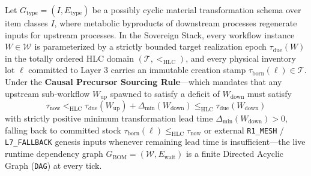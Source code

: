 \begin{theorem}
\label{thm:temporal-bom-dag}
Let $G_{\mathrm{type}} = (I, E_{\mathrm{type}})$ be a possibly cyclic material transformation schema over
item classes $I$, where metabolic byproducts of downstream processes regenerate inputs for upstream
processes. In the Sovereign Stack, every workflow instance $W \in \mathcal{W}$ is parameterized by a
strictly bounded target realization epoch $\tau_{\mathrm{due}}(W)$ in the totally ordered HLC domain
$(\mathcal{T}, <_{\mathrm{HLC}})$, and every physical inventory lot $\ell$ committed to Layer 3 carries an
immutable creation stamp $\tau_{\mathrm{born}}(\ell) \in \mathcal{T}$. Under the \textbf{Causal Precursor
Sourcing Rule}---which mandates that any upstream sub-workflow $W_{\mathrm{up}}$ spawned to satisfy a
deficit of $W_{\mathrm{down}}$ must satisfy
\begin{equation}
\label{eq:causal-precursor-rule}
\tau_{\mathrm{now}} <_{\mathrm{HLC}} \tau_{\mathrm{due}}(W_{\mathrm{up}}) + \Delta_{\min}(W_{\mathrm{down}}) \le_{\mathrm{HLC}} \tau_{\mathrm{due}}(W_{\mathrm{down}})
\end{equation}
with strictly positive minimum transformation lead time $\Delta_{\min}(W_{\mathrm{down}}) > 0$, falling
back to committed stock $\tau_{\mathrm{born}}(\ell) \le_{\mathrm{HLC}} \tau_{\mathrm{now}}$ or external
\texttt{R1\_MESH} / \texttt{L7\_FALLBACK} genesis inputs whenever remaining lead time is
insufficient---the live runtime dependency graph $G_{\mathrm{BOM}} = (\mathcal{W}, E_{\mathrm{wait}})$ is
a finite Directed Acyclic Graph (\texttt{DAG}) at every tick.
\end{theorem}

